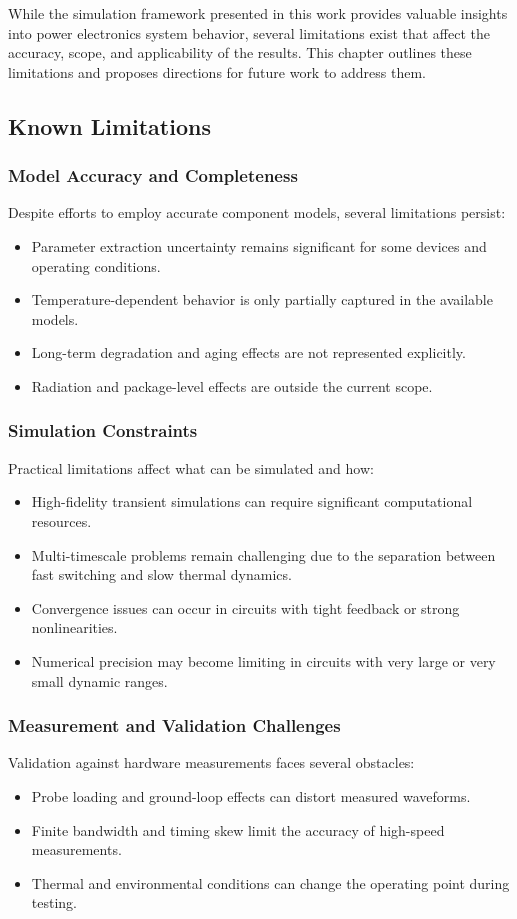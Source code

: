 While the simulation framework presented in this work provides valuable insights into power electronics system behavior, several limitations exist that affect the accuracy, scope, and applicability of the results. This chapter outlines these limitations and proposes directions for future work to address them.

\subsection{Known Limitations}
\subsubsection{Model Accuracy and Completeness}
Despite efforts to employ accurate component models, several limitations persist:
\begin{itemize}
    \item Parameter extraction uncertainty remains significant for some devices and operating conditions.
    \item Temperature-dependent behavior is only partially captured in the available models.
    \item Long-term degradation and aging effects are not represented explicitly.
    \item Radiation and package-level effects are outside the current scope.
\end{itemize}

\subsubsection{Simulation Constraints}
Practical limitations affect what can be simulated and how:
\begin{itemize}
    \item High-fidelity transient simulations can require significant computational resources.
    \item Multi-timescale problems remain challenging due to the separation between fast switching and slow thermal dynamics.
    \item Convergence issues can occur in circuits with tight feedback or strong nonlinearities.
    \item Numerical precision may become limiting in circuits with very large or very small dynamic ranges.
\end{itemize}

\subsubsection{Measurement and Validation Challenges}
Validation against hardware measurements faces several obstacles:
\begin{itemize}
    \item Probe loading and ground-loop effects can distort measured waveforms.
    \item Finite bandwidth and timing skew limit the accuracy of high-speed measurements.
    \item Thermal and environmental conditions can change the operating point during testing.
\end{itemize}

